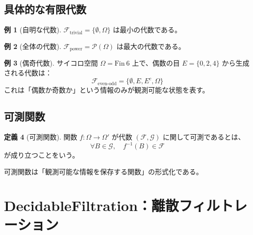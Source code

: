 \documentclass[a4paper,12pt]{ltjsarticle}
\theoremstyle{definition}
\newtheorem{definition}{定義}[section]
\newtheorem{example}[definition]{例}
\begin{document}
\subsection{具体的な有限代数}

\begin{example}[自明な代数]
$\mathcal{F}_{\text{trivial}} = \{\emptyset, \Omega\}$ は最小の代数である。
\end{example}

\begin{example}[全体の代数]
$\mathcal{F}_{\text{power}} = \mathcal{P}(\Omega)$ は最大の代数である。
\end{example}

\begin{example}[偶奇代数]
サイコロ空間 $\Omega = \text{Fin}\ 6$ 上で、偶数の目 $E = \{0, 2, 4\}$ から生成される代数は：
\[
\mathcal{F}_{\text{even-odd}} = \{\emptyset, E, E^c, \Omega\}
\]
これは「偶数か奇数か」という情報のみが観測可能な状態を表す。
\end{example}

\begin{center}
\end{center}

\subsection{可測関数}

\begin{definition}[可測関数]
関数 $f : \Omega \to \Omega'$ が代数 $(\mathcal{F}, \mathcal{G})$ に関して可測であるとは、
\[
\forall B \in \mathcal{G}, \quad f^{-1}(B) \in \mathcal{F}
\]
が成り立つことをいう。
\end{definition}

可測関数は「観測可能な情報を保存する関数」の形式化である。

\section{DecidableFiltration：離散フィルトレーション}
\end{document}
